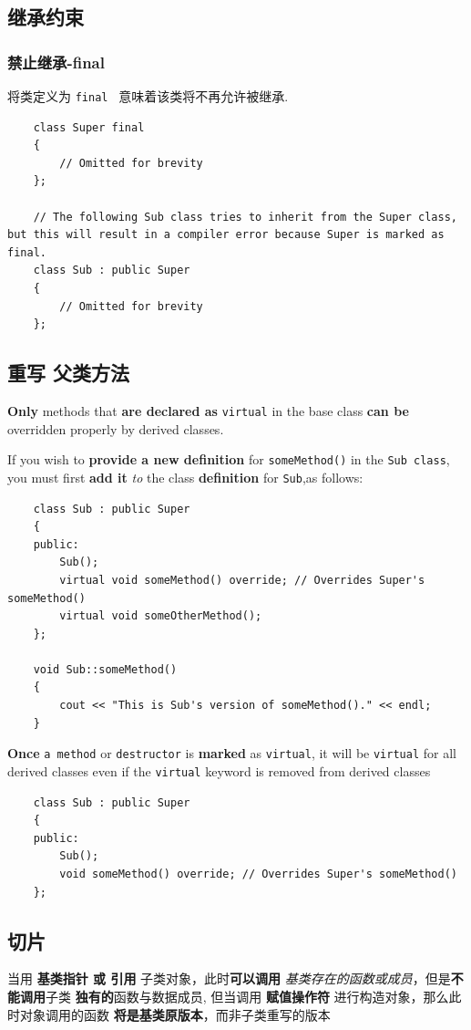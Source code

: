 \documentclass[UTF8,a4paper,12pt]{ctexbook} %
\begin{document}
		\subsection{继承约束}
			\subsubsection{禁止继承-final}
				将类定义为 \verb|final | 意味着该类将不再允许被继承.
				\begin{lstlisting}
	class Super final
	{
		// Omitted for brevity
	};
	
	// The following Sub class tries to inherit from the Super class, but this will result in a compiler error because Super is marked as final.
	class Sub : public Super
	{
		// Omitted for brevity
	};
				\end{lstlisting}
			
		\subsection{重写 父类方法}
				\textbf{Only} methods that \textbf{are declared as} \verb|virtual| in the base class \textbf{can be} overridden properly by derived classes.
				
				If you wish to \textbf{provide a new definition} for \verb|someMethod()| in the \verb|Sub class|, you must first \textbf{add it} \textit{to} the class \textbf{definition} for \verb|Sub|,as follows:
			
				\begin{lstlisting}
	class Sub : public Super
	{
	public:
		Sub();
		virtual void someMethod() override; // Overrides Super's someMethod()
		virtual void someOtherMethod();
	};
	
	void Sub::someMethod()
	{
		cout << "This is Sub's version of someMethod()." << endl;
	}
				\end{lstlisting}
			
			\textbf{Once} \verb|a method| or \verb|destructor| is \textbf{marked} as \verb|virtual|, it will be \verb|virtual| for all derived classes even if the \verb|virtual| keyword is removed from derived classes
			
				\begin{lstlisting}
	class Sub : public Super
	{
	public:
		Sub();
		void someMethod() override; // Overrides Super's someMethod()
	};
				\end{lstlisting}
				
		\subsection{切片} 
				当用 \textbf{基类指针 或 引用} 子类对象，此时\textbf{可以调用} \textit{基类存在的函数或成员}，但是\textbf{不能调用}子类 \textbf{独有的}函数与数据成员, 但当调用 \textbf{赋值操作符} 进行构造对象，那么此时对象调用的函数 \textbf{将是基类原版本}，而非子类重写的版本
				
\end{document}
